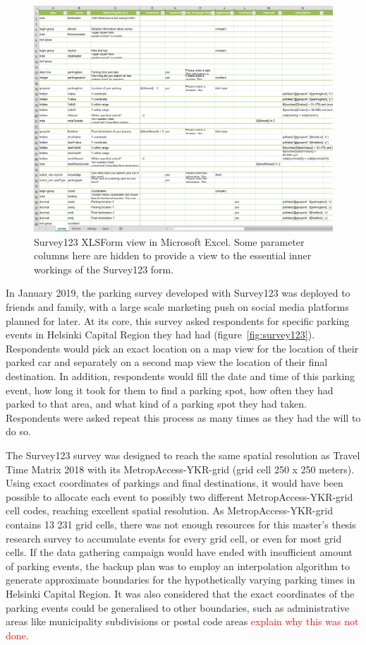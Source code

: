 \begin{figure}[H]%
    \includegraphics[width=\textwidth]{images/survey123_xlsform.png}
    \caption[Survey123 XLSForm view]{Survey123 XLSForm view in Microsoft Excel. Some parameter columns here are hidden to provide a view to the essential inner workings of the Survey123 form.}%
    \label{fig:survey123_xlsform}%
\end{figure}

In January 2019, the parking survey developed with Survey123 was deployed to friends and family, with a large scale marketing push on social media platforms planned for later. At its core, this survey asked respondents for specific parking events in Helsinki Capital Region they had had (figure~\ref{fig:survey123}). Respondents would pick an exact location on a map view for the location of their parked car and separately on a second map view the location of their final destination. In addition, respondents would fill the date and time of this parking event, how long it took for them to find a parking spot, how often they had parked to that area, and what kind of a parking spot they had taken. Respondents were asked repeat this process as many times as they had the will to do so.

The Survey123 survey was designed to reach the same spatial resolution as Travel Time Matrix 2018 with its MetropAccess-YKR-grid (grid cell 250 x 250 meters). Using exact coordinates of parkings and final destinations, it would have been possible to allocate each event to possibly two different MetropAccess-YKR-grid cell codes, reaching excellent spatial resolution. As MetropAccess-YKR-grid contains 13 231 grid cells, there was not enough resources for this master's thesis research survey to accumulate events for every grid cell, or even for most grid cells. If the data gathering campaign would have ended with insufficient amount of parking events, the backup plan was to employ an interpolation algorithm to generate approximate boundaries for the hypothetically varying parking times in Helsinki Capital Region. It was also considered that the exact coordinates of the parking events could be generalised to other boundaries, such as administrative areas like municipality subdivisions or postal code areas \textcolor{red}{explain why this was not done}. 


